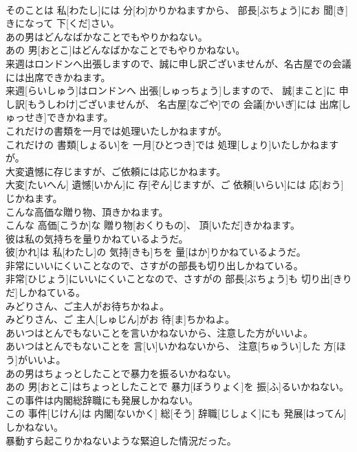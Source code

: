 \documentclass[8pt]{extreport}
\begin{document}
\begin{CJK}{UTF8}{min}
\\	そのことは 私[わたし]には 分[わ]かりかねますから、 部長[ぶちょう]にお 聞[き]きになって 下[くだ]さい。
\\	あの男はどんなばかなことでもやりかねない。	
\\	あの 男[おとこ]はどんなばかなことでもやりかねない。
\\	来週はロンドンへ出張しますので、誠に申し訳ございませんが、名古屋での会議には出席できかねます。	
\\	来週[らいしゅう]はロンドンへ 出張[しゅっちょう]しますので、 誠[まこと]に 申し訳[もうしわけ]ございませんが、 名古屋[なごや]での 会議[かいぎ]には 出席[しゅっせき]できかねます。
\\	これだけの書類を一月では処理いたしかねますが。	
\\	これだけの 書類[しょるい]を 一月[ひとつき]では 処理[しょり]いたしかねますが。
\\	大変遺憾に存じますが、ご依頼には応じかねます。	
\\	大変[たいへん] 遺憾[いかん]に 存[ぞん]じますが、ご 依頼[いらい]には 応[おう]じかねます。
\\	こんな高価な贈り物、頂きかねます。	
\\	こんな 高価[こうか]な 贈り物[おくりもの]、 頂[いただ]きかねます。
\\	彼は私の気持ちを量りかねているようだ。	
\\	彼[かれ]は 私[わたし]の 気持[きも]ちを 量[はか]りかねているようだ。
\\	非常にいいにくいことなので、さすがの部長も切り出しかねている。	
\\	非常[ひじょう]にいいにくいことなので、さすがの 部長[ぶちょう]も 切り出[きりだ]しかねている。
\\	みどりさん、ご主人がお待ちかねよ。	
\\	みどりさん、ご 主人[しゅじん]がお 待[ま]ちかねよ。
\\	あいつはとんでもないことを言いかねないから、注意した方がいいよ。	
\\	あいつはとんでもないことを 言[い]いかねないから、 注意[ちゅうい]した 方[ほう]がいいよ。
\\	あの男はちょっとしたことで暴力を振るいかねない。	
\\	あの 男[おとこ]はちょっとしたことで 暴力[ぼうりょく]を 振[ふ]るいかねない。
\\	この事件は内閣総辞職にも発展しかねない。	
\\	この 事件[じけん]は 内閣[ないかく] 総[そう] 辞職[じしょく]にも 発展[はってん]しかねない。
\\	暴動すら起こりかねないような緊迫した情況だった。	

\end{CJK}
\end{document}
